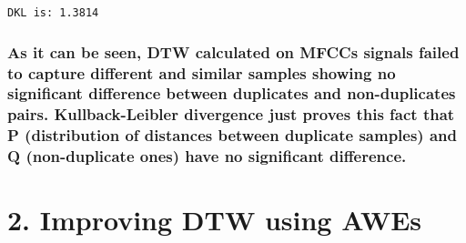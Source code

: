 \documentclass[11pt]{article}
\begin{document}
    \begin{Verbatim}[commandchars=\\\{\}]
DKL is: 1.3814

    \end{Verbatim}

    \subsubsection{As it can be seen, DTW calculated on MFCCs signals failed
to capture different and similar samples showing no significant
difference between duplicates and non-duplicates pairs. Kullback-Leibler
divergence just proves this fact that P (distribution of distances
between duplicate samples) and Q (non-duplicate ones) have no
significant
difference.}\label{as-it-can-be-seen-dtw-calculated-on-mfccs-signals-failed-to-capture-different-and-similar-samples-showing-no-significant-difference-between-duplicates-and-non-duplicates-pairs.-kullback-leibler-divergence-just-proves-this-fact-that-p-distribution-of-distances-between-duplicate-samples-and-q-non-duplicate-ones-have-no-significant-difference.}

    \section{2. Improving DTW using AWEs}\label{improving-dtw-using-awes}
\end{document}
